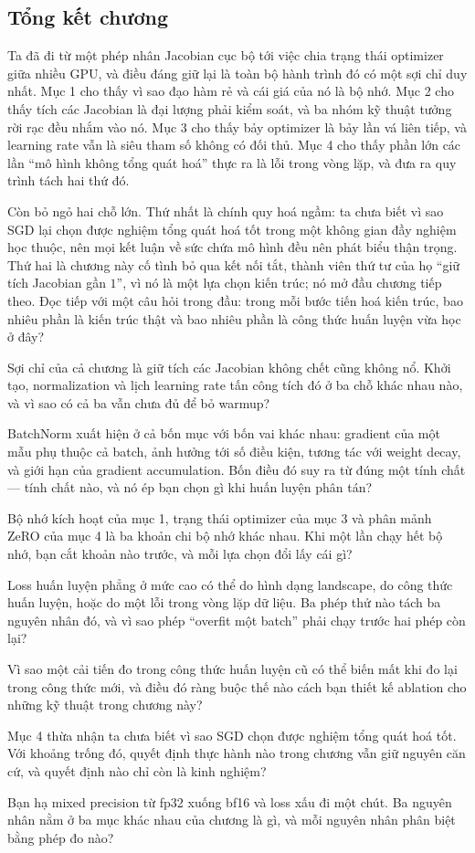 \documentclass[../../deep_learning.tex]{subfiles}
\begin{document}
\subsection*{Tổng kết chương}
Ta đã đi từ một phép nhân Jacobian cục bộ tới việc chia trạng thái optimizer giữa nhiều GPU, và điều đáng giữ lại là toàn bộ hành trình đó có một sợi chỉ duy nhất. Mục 1 cho thấy vì sao đạo hàm rẻ và cái giá của nó là bộ nhớ. Mục 2 cho thấy tích các Jacobian là đại lượng phải kiểm soát, và ba nhóm kỹ thuật tưởng rời rạc đều nhắm vào nó. Mục 3 cho thấy bảy optimizer là bảy lần vá liên tiếp, và learning rate vẫn là siêu tham số không có đối thủ. Mục 4 cho thấy phần lớn các lần ``mô hình không tổng quát hoá'' thực ra là lỗi trong vòng lặp, và đưa ra quy trình tách hai thứ đó.

Còn bỏ ngỏ hai chỗ lớn. Thứ nhất là chính quy hoá ngầm: ta chưa biết vì sao SGD lại chọn được nghiệm tổng quát hoá tốt trong một không gian đầy nghiệm học thuộc, nên mọi kết luận về sức chứa mô hình đều nên phát biểu thận trọng. Thứ hai là chương này cố tình bỏ qua kết nối tắt, thành viên thứ tư của họ ``giữ tích Jacobian gần \(1\)'', vì nó là một lựa chọn kiến trúc; nó mở đầu chương tiếp theo. Đọc tiếp  với một câu hỏi trong đầu: trong mỗi bước tiến hoá kiến trúc, bao nhiêu phần là kiến trúc thật và bao nhiêu phần là công thức huấn luyện vừa học ở đây?
\begin{tukiem}
\item Sợi chỉ của cả chương là giữ tích các Jacobian không chết cũng không nổ. Khởi tạo, normalization và lịch learning rate tấn công tích đó ở ba chỗ khác nhau nào, và vì sao có cả ba vẫn chưa đủ để bỏ warmup?
\item BatchNorm xuất hiện ở cả bốn mục với bốn vai khác nhau: gradient của một mẫu phụ thuộc cả batch, ảnh hưởng tới số điều kiện, tương tác với weight decay, và giới hạn của gradient accumulation. Bốn điều đó suy ra từ đúng một tính chất --- tính chất nào, và nó ép bạn chọn gì khi huấn luyện phân tán?
\item Bộ nhớ kích hoạt của mục 1, trạng thái optimizer của mục 3 và phân mảnh ZeRO của mục 4 là ba khoản chi bộ nhớ khác nhau. Khi một lần chạy hết bộ nhớ, bạn cắt khoản nào trước, và mỗi lựa chọn đổi lấy cái gì?
\item Loss huấn luyện phẳng ở mức cao có thể do hình dạng landscape, do công thức huấn luyện, hoặc do một lỗi trong vòng lặp dữ liệu. Ba phép thử nào tách ba nguyên nhân đó, và vì sao phép ``overfit một batch'' phải chạy trước hai phép còn lại?
\item Vì sao một cải tiến đo trong công thức huấn luyện cũ có thể biến mất khi đo lại trong công thức mới, và điều đó ràng buộc thế nào cách bạn thiết kế ablation cho những kỹ thuật trong chương này?
\item Mục 4 thừa nhận ta chưa biết vì sao SGD chọn được nghiệm tổng quát hoá tốt. Với khoảng trống đó, quyết định thực hành nào trong chương vẫn giữ nguyên căn cứ, và quyết định nào chỉ còn là kinh nghiệm?
\item Bạn hạ mixed precision từ fp32 xuống bf16 và loss xấu đi một chút. Ba nguyên nhân nằm ở ba mục khác nhau của chương là gì, và mỗi nguyên nhân phân biệt bằng phép đo nào?
\end{tukiem}
\ifSubfilesClassLoaded{\printbibliography[title={Nguồn}]}{}
\end{document}
